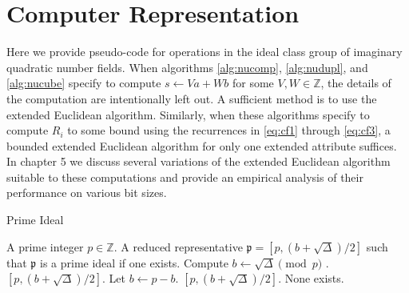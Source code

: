 \documentclass{ucalgthes1}
\theoremstyle{plain}
\theoremstyle{definition}
\newcommand{\ZZ}{\mathbb{Z}}
\begin{document}
\bigbreak
\section{Computer Representation}
\label{section:computerRepresentation}

Here we provide pseudo-code for operations in the ideal class group of imaginary quadratic number fields.  When algorithms \ref{alg:nucomp}, \ref{alg:nudupl}, and \ref{alg:nucube} specify to compute $s \leftarrow Va + Wb$ for some $V,W \in \ZZ$, the details of the computation are intentionally left out.  A sufficient method is to use the extended Euclidean algorithm.  Similarly, when these algorithms specify to compute $R_i$ to some bound using the recurrences in \eqref{eq:cf1} through \eqref{eq:cf3}, a bounded extended Euclidean algorithm for only one extended attribute suffices. In chapter 5 we discuss several variations of the extended Euclidean algorithm suitable to these computations and provide an empirical analysis of their performance on various bit sizes.

\bigbreak
\bigbreak


\begin{comment}
\begin{algorithm}[h]
\caption{Identity}
\label{alg:identity}
\begin{algorithmic}[1]
\ENSURE A reduced representative for the class of principal ideals.
\IF {$\Delta \equiv 1 \pmod 4$}
	\STATE Let $b = 1$.
\ELSE
	\STATE Let $b = 0$.
\ENDIF
\RETURN $[1, (b+\sqrt\Delta)/2]$.
\end{algorithmic}
\end{algorithm}
\end{comment}

\begin{comment}
\begin{algorithm}[h]
\caption{Iverse}
\label{alg:inverse}
\begin{algorithmic}[1]
\REQUIRE A reduced representative $\mathfrak a = [a, (b+\sqrt\Delta)/2]$.
\ENSURE A reduced representative $\mathfrak a^{-1}$ such that $\mathfrak a \mathfrak a^{-1}$ is principal.
\RETURN $[a, (-b+\sqrt\Delta)/2]$.
\end{algorithmic}
\end{algorithm}
\end{comment}


\begin{algorithm}[h]
\caption{Prime Ideal}
\label{alg:prime}
\begin{algorithmic}[1]
\REQUIRE A prime integer $p \in \ZZ$.
\ENSURE A reduced representative $\mathfrak p = [p, (b+\sqrt\Delta)/2]$ such that $\mathfrak p$ is a prime ideal if one exists.
\STATE Compute $b \leftarrow \sqrt\Delta \pmod p$ .
	\RETURN $[p, (b+\sqrt\Delta)/2]$.	
\ENDIF
\STATE Let $b \leftarrow p-b$.
	\RETURN $[p, (b+\sqrt\Delta)/2]$.	
\ENDIF
\RETURN None exists.
\end{algorithmic}
\end{algorithm}
\end{document}
